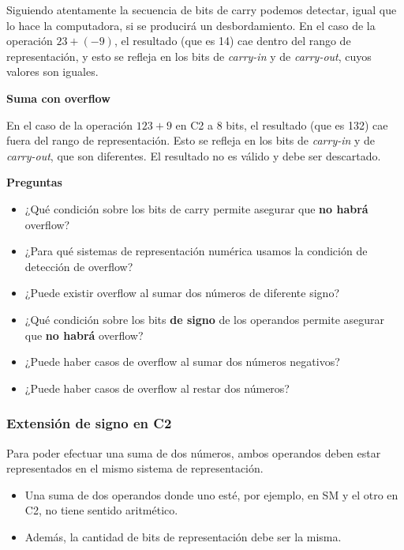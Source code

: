 \documentclass[spanish,A4,]{article}
\begin{document}
Siguiendo atentamente la secuencia de bits de carry podemos detectar,
igual que lo hace la computadora, si se producirá un desbordamiento. En
el caso de la operación $23 + (-9)$, el resultado (que es 14) cae dentro
del rango de representación, y esto se refleja en los bits de
\emph{carry-in} y de \emph{carry-out}, cuyos valores son iguales.

\textbf{Suma con overflow}

En el caso de la operación $123 + 9$ en C2 a 8 bits, el resultado (que
es 132) cae fuera del rango de representación. Esto se refleja en los
bits de \emph{carry-in} y de \emph{carry-out}, que son diferentes. El
resultado no es válido y debe ser descartado.

\textbf{Preguntas}

\begin{itemize}
\itemsep1pt\parskip0pt
\item
  ¿Qué condición sobre los bits de carry permite asegurar que \textbf{no
  habrá} overflow?
\item
  ¿Para qué sistemas de representación numérica usamos la condición de
  detección de overflow?
\item
  ¿Puede existir overflow al sumar dos números de diferente signo?
\item
  ¿Qué condición sobre los bits \textbf{de signo} de los operandos
  permite asegurar que \textbf{no habrá} overflow?
\item
  ¿Puede haber casos de overflow al sumar dos números negativos?
\item
  ¿Puede haber casos de overflow al restar dos números?
\end{itemize}

\subsubsection{Extensión de signo en
C2}\label{extensiuxf3n-de-signo-en-c2}

Para poder efectuar una suma de dos números, ambos operandos deben estar
representados en el mismo sistema de representación.

\begin{itemize}
\itemsep1pt\parskip0pt
\item
  Una suma de dos operandos donde uno esté, por ejemplo, en SM y el otro
  en C2, no tiene sentido aritmético.
\item
  Además, la cantidad de bits de representación debe ser la misma.
\end{itemize}
\end{document}
